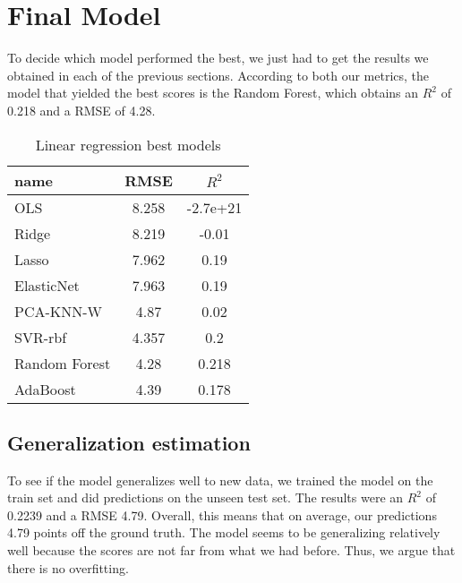
\section{Final Model}%
\label{sec:final-model}

To decide which model performed the best, we just had to get the results we obtained in each of the previous sections. According to both our metrics, the model that yielded the best scores is the Random Forest, which obtains an $R^2$ of 0.218 and a RMSE of 4.28.

\begin{table}[H]
    \centering
    \begin{tabular}{lcc}
        \toprule
        name & RMSE & $R^2$ \\
        \midrule
        OLS & 8.258 & -2.7e+21 \\
        Ridge & 8.219 &  -0.01 \\
        Lasso & 7.962 &  0.19 \\
        ElasticNet & 7.963 &  0.19 \\
        PCA-KNN-W & 4.87 & 0.02 \\
        SVR-rbf & 4.357 & 0.2 \\
        Random Forest & 4.28 & 0.218 \\
        AdaBoost & 4.39 & 0.178 \\
        \bottomrule
    \end{tabular}
    \caption{Linear regression best models}
    \label{ml:lr}
\end{table}

\subsection{Generalization estimation}
\label{sub:generalization-estimation}

To see if the model generalizes well to new data, we trained the model on the train set and did predictions on the unseen test set. The results were an $R^2$ of 0.2239 and a RMSE 4.79. Overall, this means that on average, our predictions 4.79 points off the ground truth. The model seems to be generalizing relatively well because the scores are not far from what we had before. Thus, we argue that there is no overfitting.
